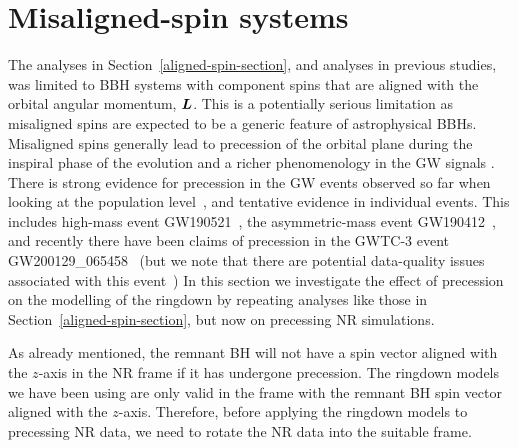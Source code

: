 \section{Misaligned-spin systems}\label{misaligned-spin-section}

The analyses in Section~\ref{aligned-spin-section}, and analyses in previous studies,
was limited to BBH systems with component spins that are aligned with the orbital angular momentum, $\vb*{L}$.
This is a potentially serious limitation as misaligned spins are expected to be a generic feature of astrophysical BBHs.
Misaligned spins generally lead to precession of the orbital plane during the inspiral phase of the evolution and a richer phenomenology in the GW signals \cite{Apostolatos:1994mx}.
There is strong evidence for precession in the GW events observed so far when looking at the population level~\cite{LIGOScientific:2020kqk, LIGOScientific:2021psn}, and tentative evidence in individual events. 
This includes high-mass event GW190521~\cite{LIGOScientific:2020iuh, LIGOScientific:2020ufj}, the asymmetric-mass event GW190412~\cite{LIGOScientific:2020stg}, and recently there have been claims of precession in the GWTC-3 event GW200129\_065458~\cite{Hannam:2021pit} (but we note that there are potential data-quality issues associated with this event~\cite{Payne:2022spz})
In this section we investigate the effect of precession on the modelling of the ringdown by repeating analyses like those in Section~\ref{aligned-spin-section}, but now on precessing NR simulations.

As already mentioned, the remnant BH will not have a spin vector aligned with the $z$-axis in the NR frame if it has undergone precession. 
The ringdown models we have been using are only valid in the frame with the remnant BH spin vector aligned with the $z$-axis.
Therefore, before applying the ringdown models to precessing NR data, we need to rotate the NR data into the suitable frame. 

